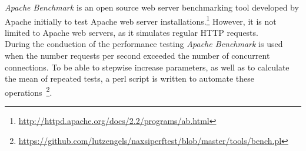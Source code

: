 \emph{Apache Benchmark} is an open source web server benchmarking tool developed by Apache initially to test Apache web server installations.\footnote{\url{http://httpd.apache.org/docs/2.2/programs/ab.html}} However, it is not limited to Apache web servers, as it simulates regular HTTP requests.\\
During the conduction of the performance testing \emph{Apache Benchmark} is used when the number requests per second exceeded the number of concurrent connections. To be able to stepwise increase parameters, as well as to calculate the mean of repeated tests, a perl script is written to automate these operations~\footnote{\url{https://github.com/lutzengels/naxsiperftest/blob/master/tools/bench.pl}}. 
